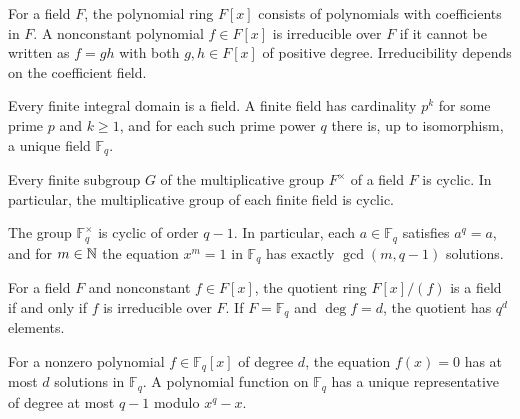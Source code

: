 \begin{definition}
For a field $F$, the polynomial ring $F[x]$ consists of polynomials with coefficients in $F$. A nonconstant polynomial $f\in F[x]$ is irreducible over $F$ if it cannot be written as $f=gh$ with both $g,h\in F[x]$ of positive degree. Irreducibility depends on the coefficient field.
\end{definition}

\begin{theorem}
Every finite integral domain is a field. A finite field has cardinality $p^k$ for some prime $p$ and $k\ge1$, and for each such prime power $q$ there is, up to isomorphism, a unique field $\mathbb{F}_q$.
\end{theorem}

\begin{theorem}
Every finite subgroup $G$ of the multiplicative group $F^\times$ of a field $F$ is cyclic. In particular, the multiplicative group of each finite field is cyclic.
\end{theorem}

\begin{theorem}
The group $\mathbb{F}_q^\times$ is cyclic of order $q-1$. In particular, each $a\in\mathbb{F}_q$ satisfies $a^q=a$, and for $m\in\mathbb{N}$ the equation $x^m=1$ in $\mathbb{F}_q$ has exactly $\gcd(m, q-1)$ solutions.
\end{theorem}

\begin{proposition}
For a field $F$ and nonconstant $f\in F[x]$, the quotient ring $F[x]/(f)$ is a field if and only if $f$ is irreducible over $F$. If $F=\mathbb{F}_q$ and $\deg f=d$, the quotient has $q^d$ elements.
\end{proposition}

\begin{theorem}
For a nonzero polynomial $f\in\mathbb{F}_q[x]$ of degree $d$, the equation $f(x)=0$ has at most $d$ solutions in $\mathbb{F}_q$. A polynomial function on $\mathbb{F}_q$ has a unique representative of degree at most $q-1$ modulo $x^q-x$.
\end{theorem}
